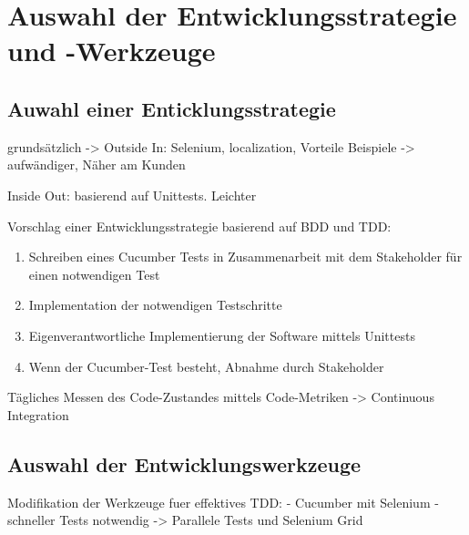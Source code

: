 \section{Auswahl der Entwicklungsstrategie und -Werkzeuge}
\subsection{Auwahl einer Enticklungsstrategie}
grundsätzlich ->
        Outside In: Selenium, localization, Vorteile Beispiele
          -> aufwändiger, Näher am Kunden

Inside Out: basierend auf Unittests. Leichter
    
Vorschlag einer Entwicklungsstrategie basierend auf BDD und TDD:

\begin{enumerate}
\item Schreiben eines Cucumber Tests in Zusammenarbeit mit dem Stakeholder für einen notwendigen Test
\item Implementation der notwendigen Testschritte
\item Eigenverantwortliche Implementierung der Software mittels Unittests
\item Wenn der Cucumber-Test besteht, Abnahme durch Stakeholder
\end{enumerate}

Tägliches Messen des Code-Zustandes mittels Code-Metriken -> Continuous Integration

\subsection{Auswahl der Entwicklungswerkzeuge}

Modifikation der Werkzeuge fuer effektives TDD:
      - Cucumber mit Selenium
      - schneller Tests notwendig -> Parallele Tests und Selenium Grid